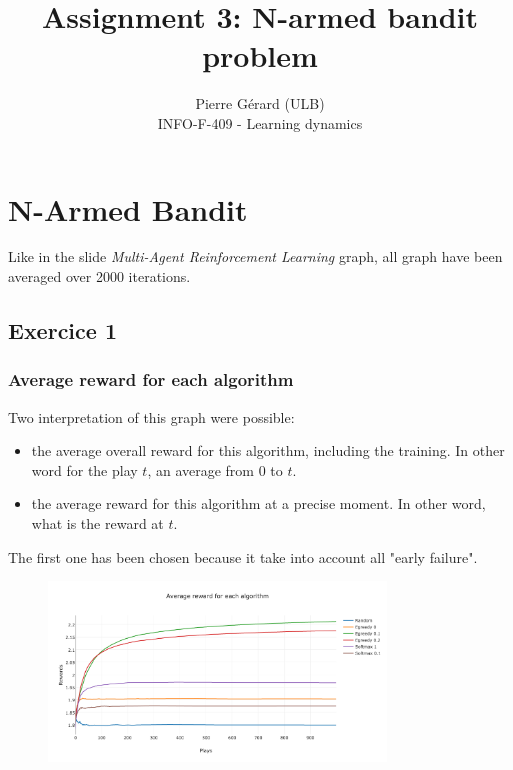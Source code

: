 \documentclass[11pt]{article}
\begin{document}
 
 
\setlength\parindent{0pt}
 
\title{Assignment 3: N-armed bandit problem}%
\author{Pierre Gérard (ULB)\\ %
INFO-F-409 - Learning dynamics} %
 
\maketitle

\section{N-Armed Bandit}
Like in the slide \textit{Multi-Agent Reinforcement Learning} graph, all graph have been averaged over 2000 iterations.


\subsection{Exercice 1}

\subsubsection{Average reward for each algorithm}

Two interpretation of this graph were possible:
\begin{itemize}
	\item the average overall reward for this algorithm, including the training. In other word for the play $t$, an average from $0$ to $t$.
	\item the average reward for this algorithm at a precise moment. In other word, what is the reward at $t$.
\end{itemize}
The first one has been chosen because it take into account all "early failure".

\begin{figure}[H]
   \centering
   \includegraphics[width=0.8\textwidth]{img/1-1/reward.png}
\end{figure}
\end{document}
